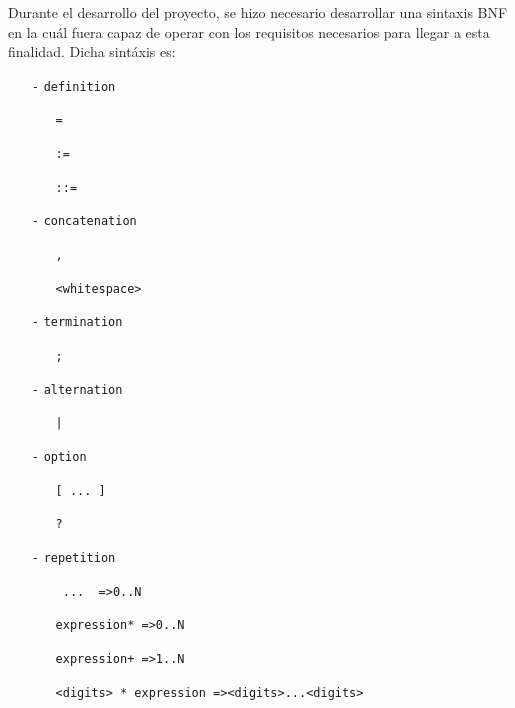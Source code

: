 \documentclass[conference]{IEEEtran}
\begin{document}
Durante el desarrollo del proyecto, se hizo necesario desarrollar una sintaxis BNF en la cuál fuera capaz de operar con los requisitos necesarios para llegar a esta finalidad. Dicha sintáxis es:
\begin{itemize} [\footnotesize]
    \item [\texttt{-}] \texttt{definition}
    \begin{itemize}
        \item [ ] \texttt{=}
        \item [ ] \texttt{:=}
        \item [ ] \texttt{::=}
    \end{itemize}
    \item [\texttt{-}] \texttt{concatenation}
    \begin{itemize}
        \item [ ] \texttt{,}
        \item [ ] \texttt{<whitespace>}
    \end{itemize}
    \item [\texttt{-}] \texttt{termination}
    \begin{itemize}
        \item [ ] \texttt{;}
    \end{itemize}
    \item [\texttt{-}] \texttt{alternation}
    \begin{itemize}
        \item [ ] \texttt{|}
    \end{itemize}
    \item [\texttt{-}] \texttt{option}
    \begin{itemize}
        \item [ ] \texttt{[ ... ]}
        \item [ ] \texttt{?}
    \end{itemize}
    \item [\texttt{-}] \texttt{repetition}
    \begin{itemize}
        \item [ ] \texttt{{ ... } =>\hspace{0.2cm}0..N}
        \item [ ] \texttt{expression* =>\hspace{0.2cm}0..N}
        \item [ ] \texttt{expression+ =>\hspace{0.2cm}1..N}
        \item [ ] \texttt{<digits> * expression =>\hspace{0.2cm}<digits>...<digits>}

\end{itemize}
\end{itemize}
\end{document}
